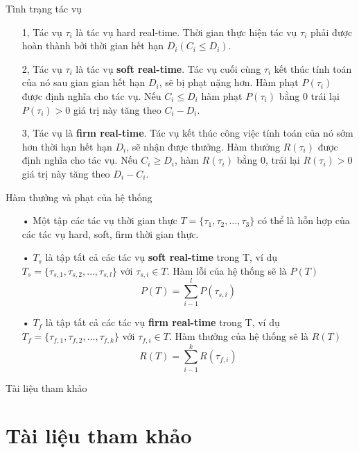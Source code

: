 \documentclass{beamer}
\begin{document}
\begin{frame}{Tình trạng tác vụ}
\begin{itemize}
\item[1, ] Tác vụ $\tau_i$ là tác vụ hard real-time. Thời gian thực hiện tác vụ $\tau_i$ phải được hoàn thành bởi thời gian hết hạn $D_i ( C_i \leq D_i )$.
\item[2, ] Tác vụ $\tau_i$ là tác vụ \textbf{soft real-time}. Tác vụ cuối cùng $\tau_i$ kết thúc tính toán của nó sau gian gian hết hạn $D_i$, sẽ bị phạt nặng hơn. Hàm phạt $P(\tau_i)$ được định nghĩa cho tác vụ. Nếu $C_i \leq D_i$ hàm phạt $P(\tau_i)$ bằng 0 trái lại $P(\tau_i) > 0$ giá trị này tăng theo $C_i - D_i$.
\item[3, ] Tác vụ là \textbf{firm real-time}. Tác vụ kết thúc công việc tính toán của nó sớm hơn thời hạn hết hạn $D_i$, sẽ nhận được thưởng. Hàm thưởng $R(\tau_i)$ được định nghĩa cho tác vụ. Nếu $C_i \geq D_i$, hàm $R(\tau_i)$ bằng 0, trái lại $R(\tau_i) > 0$ giá trị này tăng theo $D_i - C_i$.
\end{itemize}
\end{frame}
\begin{frame}{Hàm thưởng và phạt của hệ thống}
\begin{itemize}
\item[•] Một tập các tác vụ thời gian thực $T = \{\tau_1, \tau_2, \ldots , \tau_3\}$ có thể là hỗn hợp của các tác vụ hard, soft, firm thời gian thực.
\item[•] $T_s$ là tập tất cả các tác vụ \textbf{soft real-time} trong T, ví dụ $T_s = \{\tau_{s,1}, \tau_{s,2}, \ldots , \tau_{s,l}\}$ với $\tau_{s,i} \in T$. Hàm lỗi của hệ thống sẽ là $P(T)$
\begin{displaymath}
P(T) = \sum_{i-1}^{l} P(\tau_{s,i})
\end{displaymath}
\item[•] $T_f$ là tập tất cả các tác vụ \textbf{firm real-time} trong T, ví dụ $T_f = \{\tau_{f,1}, \tau_{f,2}, \ldots , \tau_{f,k}\}$ với $\tau_{f,i} \in T$. Hàm thưởng của hệ thống sẽ là $R(T)$
\begin{displaymath}
R(T) = \sum_{i-1}^{k} R(\tau_{f,i})
\end{displaymath}
\end{itemize}
\end{frame}
\begin{frame}{Tài liệu tham khảo}
\section*{Tài liệu tham khảo}
\end{frame}
\end{document}
